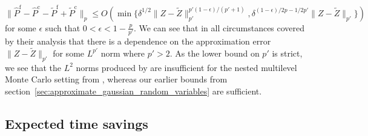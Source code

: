 \documentclass[manuscript,review]{acmart}
\begin{document}
\begin{equation*}
\lVert \hat{P}^{\mathrm{f}} - \hat{P}^{\mathrm{c}} - \tilde{P}^{\mathrm{f}} + \tilde{P}^{\mathrm{c}}\rVert_p 
\leq O(\min\{
\delta^{1/2} \lVert Z - \tilde{Z} \rVert_{p'}^{p'(1-\epsilon)/(p'+1)},
\delta^{(1-\epsilon)/2p -1/2p'}    \lVert Z - \tilde{Z} \rVert_{p'}
\})
\end{equation*}
for some  $ \epsilon $ such that $ 0<\epsilon<1 - \tfrac{p}{p'} $. We can see that in all circumstances covered by their analysis that there is a dependence on the approximation error $  \lVert Z - \tilde{Z} \rVert_{p'} $ for some $ L^{p'} $ norm where $ p' > 2 $. As the lower bound on $ p' $ is strict, we see that the $ L^2 $ norms produced by \citet{giles2019random_quadrature} are insufficient for the nested multilevel Monte Carlo setting from \citet{giles2020approximate}, whereas our earlier bounds from section~\ref{sec:approximate_gaussian_random_variables} are sufficient. 

\subsection{Expected time savings}
\end{document}
